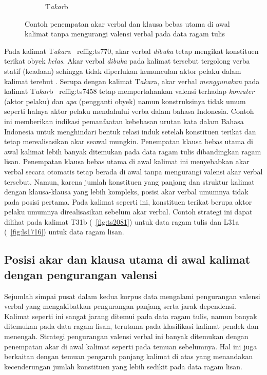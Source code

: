 \begin{figure}
\begin{subfigure}{.57\linewidth}
	\caption{T\textit{akar}b}
	\label{fig:ts7458} 
\end{subfigure}
\caption{Contoh penempatan akar verbal dan klausa bebas utama di awal kalimat tanpa mengurangi valensi verbal pada data ragam tulis}
\label{fig:rootnovalensi}
\end{figure}

Pada kalimat T\textit{akar}a \pic~ref{fig:ts770}, akar verbal \textit{dibuka} tetap mengikat konstituen terikat obyek \textit{kelas}. Akar verbal \textit{dibuka} pada kalimat tersebut tergolong verba statif (keadaan) sehingga tidak diperlukan kemunculan aktor pelaku dalam kalimat terebut \cite{sneddon2010indonesian}. Serupa dengan kalimat T\textit{akar}a, akar verbal \textit{menggunakan} pada kalimat T\textit{akar}b \pic~ref{fig:ts7458} tetap mempertahankan valensi terhadap \textit{komuter} (aktor pelaku) dan \textit{apa} (pengganti obyek) namun konstruksinya tidak umum seperti halnya aktor pelaku mendahului verba dalam bahasa Indonesia. Contoh ini memberikan indikasi pemanfaatan kebebasan urutan kata dalam Bahasa Indonesia untuk menghindari bentuk relasi induk setelah konstituen terikat dan tetap merealisasikan akar seawal mungkin. Penempatan klausa bebas utama di awal kalimat lebih banyak ditemukan pada data ragam tulis dibandingkan ragam lisan. Penempatan klausa bebas utama di awal kalimat ini menyebabkan akar verbal secara otomatis tetap berada di awal tanpa mengurangi valensi akar verbal tersebut. Namun, karena jumlah konstituen yang panjang dan struktur kalimat dengan klausa-klausa yang lebih kompleks, posisi akar verbal umumnya tidak pada posisi pertama. Pada kalimat seperti ini, konstituen terikat berupa aktor pelaku umumnya direalisasikan sebelum akar verbal. Contoh strategi ini dapat dilihat pada kalimat T31b (\pic~\ref{fig:ts2081}) untuk data ragam tulis dan L31a (\pic~\ref{fig:ls1716}) untuk data ragam lisan.

\subsection{Posisi akar dan klausa utama di awal kalimat dengan pengurangan valensi}
Sejumlah simpai pusat dalam kedua korpus data mengalami pengurangan valensi verbal yang mengakibatkan pengurangan panjang serta jarak dependensi. Kalimat seperti ini sangat jarang ditemui pada data ragam tulis, namun banyak ditemukan pada data ragam lisan, terutama pada klasifikasi kalimat pendek dan menengah. Strategi pengurangan valensi verbal ini banyak ditemukan dengan penempatan akar di awal kalimat seperti pada temuan sebelumnya. Hal ini juga berkaitan dengan temuan pengaruh panjang kalimat di atas yang menandakan kecenderungan jumlah konstituen yang lebih sedikit pada data ragam lisan.  

